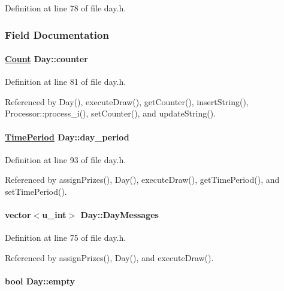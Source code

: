 Definition at line 78 of file day.h.

\subsubsection{Field Documentation}
\hypertarget{classDay_Dayo2}{
\paragraph[counter]{\setlength{\rightskip}{0pt plus 5cm}\hyperlink{classCount}{Count} Day::counter}\hfill}
\label{classDay_Dayo2}




Definition at line 81 of file day.h.

Referenced by Day(), execute\-Draw(), get\-Counter(), insert\-String(), Processor::process\_\-i(), set\-Counter(), and update\-String().\hypertarget{classDay_Dayo6}{
\paragraph[day\_\-period]{\setlength{\rightskip}{0pt plus 5cm}\hyperlink{classTimePeriod}{Time\-Period} Day::day\_\-period}\hfill}
\label{classDay_Dayo6}




Definition at line 93 of file day.h.

Referenced by assign\-Prizes(), Day(), execute\-Draw(), get\-Time\-Period(), and set\-Time\-Period().\hypertarget{classDay_Dayo1}{
\paragraph[DayMessages]{\setlength{\rightskip}{0pt plus 5cm}vector$<$u\_\-int$>$ Day::Day\-Messages}\hfill}
\label{classDay_Dayo1}




Definition at line 75 of file day.h.

Referenced by assign\-Prizes(), Day(), and execute\-Draw().\hypertarget{classDay_Dayo7}{
\paragraph[empty]{\setlength{\rightskip}{0pt plus 5cm}bool Day::empty}\hfill}
\label{classDay_Dayo7}




